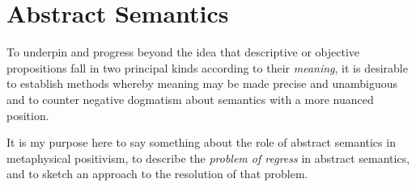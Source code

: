 
\section{Abstract Semantics}\label{AbstractSemantics}

To underpin and progress beyond the idea that descriptive or objective propositions fall in two principal kinds according to their \emph{meaning}, it is desirable to establish methods whereby meaning may be made precise and unambiguous and to counter negative dogmatism about semantics with a more nuanced position.

It is my purpose here to say something about the role of abstract semantics in metaphysical positivism, to describe the \emph{problem of regress} in abstract semantics, and to sketch an approach to the resolution of that problem.
